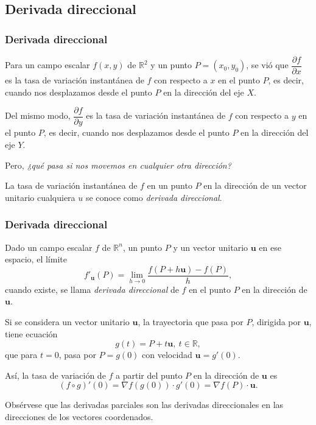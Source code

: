 \subsection{Derivada direccional}
\begin{frame}
\frametitle{Derivada direccional}
Para un campo escalar $f(x,y)$ de $\mathbb{R}^2$ y un punto $P=(x_0,y_0)$, se vió que $\dfrac{\partial f}{\partial x}$
es la tasa de variación instantánea de $f$ con respecto a $x$ en el punto $P$, es decir, cuando nos desplazamos desde el
punto $P$ en la dirección del eje $X$.

Del mismo modo, $\dfrac{\partial f}{\partial y}$ es la tasa de variación instantánea de $f$ con respecto a $y$ en el
punto $P$, es decir, cuando nos desplazamos desde el punto $P$ en la dirección del eje $Y$.

Pero, \emph {¿qué pasa si nos movemos en cualquier otra dirección?}

La tasa de variación instantánea de $f$ en un punto $P$ en la dirección de un vector unitario cualquiera $u$ se conoce como \emph{derivada direccional}.

\end{frame}


\begin{frame}
\frametitle{Derivada direccional}
\begin{definicion}
Dado un campo escalar $f$ de $\mathbb{R}^n$, un punto $P$ y un vector unitario $\mathbf{u}$ en ese espacio, el límite
\[
f'_{\mathbf{u}}(P) = \lim_{h\rightarrow 0}\frac{f(P+h\mathbf{u})-f(P)}{h},
\] 
cuando existe, se llama \emph{derivada direccional} de $f$ en el punto $P$ en la dirección de $\mathbf{u}$.
\end{definicion}
Si se considera un vector unitario $\mathbf{u}$, la trayectoria que pasa por $P$, dirigida por $\mathbf{u}$, tiene ecuación
\[
g(t)=P+t\mathbf{u},\ t\in\mathbb{R},
\]
que para $t=0$, pasa por $P=g(0)$ con velocidad $\mathbf{u}=g'(0)$.

Así, la tasa de variación de $f$ a partir del punto $P$ en la dirección de $\mathbf{u}$ es
\[
(f\circ g)'(0) = \nabla f(g(0))\cdot g'(0) = \nabla f(P)\cdot \mathbf{u}.
\]

Obsérvese que las derivadas parciales son las derivadas direccionales en las direcciones de los vectores coordenados. 
\end{frame}


